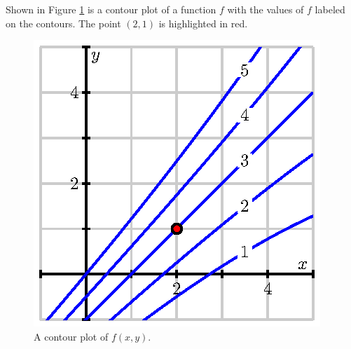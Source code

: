\begin{exercises} 

\item \label{Ez:10.3.0}   Shown in Figure \ref{F:10.3.activity.contour} is a contour
  plot of a function $f$ with the values of $f$ labeled on the
  contours.  The point $(2,1)$ is highlighted in red. 

\begin{figure}[ht]
  \begin{center}
    \includegraphics{figures/fig_10_3_activity_contour.eps}
    \caption{A contour plot of $f(x,y)$.}
    \label{F:10.3.activity.contour}
  \end{center}
\end{figure}


\end{exercises}
